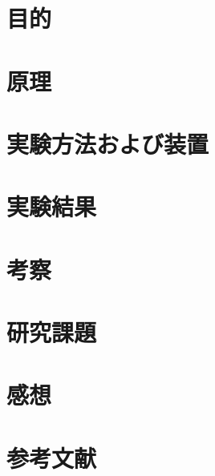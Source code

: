 \documentclass[xelatex,11pt,a4paper,ja=standard]{bxjsarticle}
\begin{document}
\maketuatcover

\section{目的}
\section{原理}
\section{実験方法および装置}
\section{実験結果}
\section{考察}
\section{研究課題}
\section{感想}
\section*{参考文献}
\end{document}
